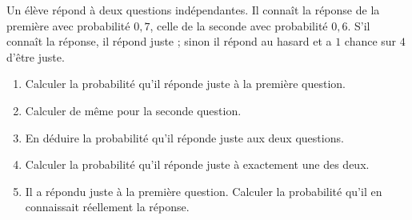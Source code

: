 Un élève répond à deux questions indépendantes. Il connaît la réponse de la
première avec probabilité $0{,}7$, celle de la seconde avec probabilité
$0{,}6$. S'il connaît la réponse, il répond juste ; sinon il répond au hasard
et a $1$ chance sur $4$ d'être juste.
\begin{enumerate}
	\item Calculer la probabilité qu'il réponde juste à la première question.
	\item Calculer de même pour la seconde question.
	\item En déduire la probabilité qu'il réponde juste aux deux questions.
	\item Calculer la probabilité qu'il réponde juste à exactement une des
	deux.
	\item Il a répondu juste à la première question. Calculer la probabilité
	qu'il en connaissait réellement la réponse.
\end{enumerate}
